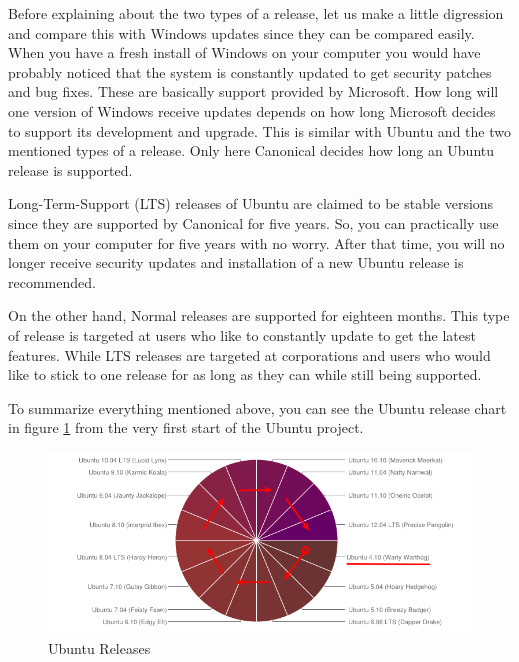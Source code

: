 \par \noindent Before explaining about the two types of a release, let us make a little digression and compare this with Windows updates since they can be compared easily. When you have a fresh install of Windows on your computer you would have probably noticed that the system is constantly updated to get security patches and bug fixes. These are basically support provided by Microsoft. How long will one version of Windows receive updates depends on how long Microsoft decides to support its development and upgrade. This is similar with Ubuntu and the two mentioned types of a release. Only here Canonical  decides how long an Ubuntu release is supported. \\

\par \noindent Long-Term-Support (LTS) releases of Ubuntu are claimed to be stable versions since they are supported by Canonical for five years. So, you can practically use them on your computer for five years with no worry. After that time, you will no longer receive security updates and installation of a new Ubuntu release is recommended.\\

\par \noindent On the other hand, Normal releases are supported for eighteen months. This type of release is targeted at users who like to constantly update to get the latest features. While LTS releases are targeted at corporations and users who would like to stick to one release for as long as they can while still being supported.\\

\par \noindent To summarize everything mentioned above, you can see the Ubuntu release chart in figure \ref{fig:ubuntu-releases} from the very first start of the Ubuntu project. \\

\begin{figure}[h]	
	\begin{center}
	\includegraphics[width=400pt]{./images/about-ubuntu/ubuntu-releases.png}
	\caption{Ubuntu Releases}	
	\label{fig:ubuntu-releases}	
	\end{center}
\end{figure}


